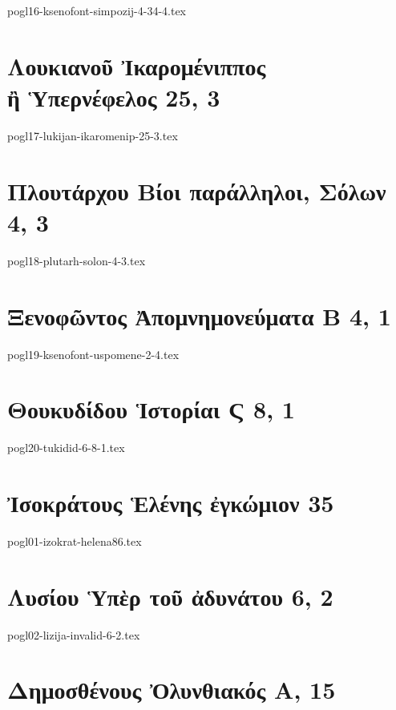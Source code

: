\documentclass[a4paper,12pt,twoside]{report}
\begin{document}
{pogl16-ksenofont-simpozij-4-34-4.tex}

\chapter[Λουκιανοῦ Ἰκαρομένιππος]{\textgreek[variant=ancient]{Λουκιανοῦ Ἰκαρομένιππος \\ἢ Ὑπερνέφελος} 25, 3}

{pogl17-lukijan-ikaromenip-25-3.tex}

\chapter[Πλουτάρχου Σόλων]{\textgreek[variant=ancient]{Πλουτάρχου Βίοι παράλληλοι, Σόλων} 4, 3}

{pogl18-plutarh-solon-4-3.tex}

\chapter[Ξενοφῶντος Ἀπομνημονεύματα Β]{\textgreek[variant=ancient]{Ξενοφῶντος Ἀπομνημονεύματα Β} 4, 1}

{pogl19-ksenofont-uspomene-2-4.tex}



\chapter[Θουκυδίδου Ἱστορίαι Ϛ]{\textgreek[variant=ancient]{Θουκυδίδου Ἱστορίαι Ϛ} 8, 1}

{pogl20-tukidid-6-8-1.tex}


\chapter[Ἰσοκράτους Ἑλένης ἐγκώμιον]{\textgreek[variant=ancient]{Ἰσοκράτους Ἑλένης ἐγκώμιον} 35}

{pogl01-izokrat-helena86.tex}

\chapter[Λυσίου Ὑπὲρ τοῦ ἀδυνάτου]{\textgreek[variant=ancient]{Λυσίου Ὑπὲρ τοῦ ἀδυνάτου} 6, 2}

{pogl02-lizija-invalid-6-2.tex}

\chapter[Δημοσθένους Ὀλυνθιακός Α]{\textgreek[variant=ancient]{Δημοσθένους Ὀλυνθιακός Α,} 15}
\end{document}

